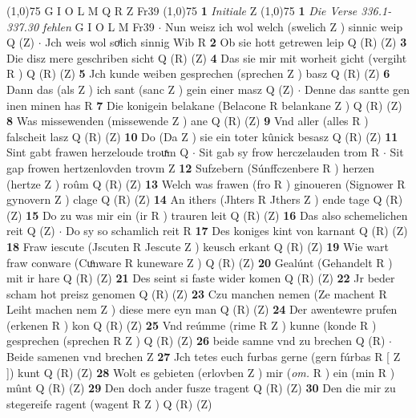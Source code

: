 \documentclass[8pt,a4paper,notitlepage]{article}
\begin{document}
\begin{table}[ht]
\begin{minipage}[t]{0.5\linewidth}
\scriptsize
\line(1,0){75} \newline
G I O L M Q R Z Fr39 \newline
\line(1,0){75} \newline
\textbf{1} \textit{Initiale} Z  \newline
\line(1,0){75} \newline
\textbf{1} \textit{Die Verse 336.1-337.30 fehlen} G I O L M Fr39   $\cdot$ Nun weisz ich wol welch (swelich Z ) sinnic weip Q (Z)  $\cdot$ Jch weis wol soͯlich sinnig Wib R \textbf{2} Ob sie hott getrewen leip Q (R) (Z) \textbf{3} Die disz mere geschriben sicht Q (R) (Z) \textbf{4} Das sie mir mit worheit gicht (vergiht R ) Q (R) (Z) \textbf{5} Jch kunde weiben gesprechen (sprechen Z ) basz Q (R) (Z) \textbf{6} Dann das (als Z ) ich sant (sanc Z ) gein einer masz Q (Z)  $\cdot$ Denne das santte gen inen minen has R \textbf{7} Die konigein belakane (Belacone R belankane Z ) Q (R) (Z) \textbf{8} Was missewenden (missewende Z ) ane Q (R) (Z) \textbf{9} Vnd aller (alles R ) falscheit lasz Q (R) (Z) \textbf{10} Do (Da Z ) sie ein toter kûnick besasz Q (R) (Z) \textbf{11} Sint gabt frawen herzeloude trouͯm Q  $\cdot$ Sit gab sy frow herczelauden trom R  $\cdot$ Sit gap frowen hertzenlovden trovm Z \textbf{12} Sufzebern (Súnffczenbere R ) herzen (hertze Z ) roûm Q (R) (Z) \textbf{13} Welch was frawen (fro R ) ginoueren (Signower R gynovern Z ) clage Q (R) (Z) \textbf{14} An ithers (Jhters R Jthers Z ) ende tage Q (R) (Z) \textbf{15} Do zu was mir ein (ir R ) trauren leit Q (R) (Z) \textbf{16} Das also schemelichen reit Q (Z)  $\cdot$ Do sy so schamlich reit R \textbf{17} Des koniges kint von karnant Q (R) (Z) \textbf{18} Fraw iescute (Jscuten R Jescute Z ) keusch erkant Q (R) (Z) \textbf{19} Wie wart fraw conware (Cuͦnware R kuneware Z ) Q (R) (Z) \textbf{20} Gealúnt (Gehandelt R ) mit ir hare Q (R) (Z) \textbf{21} Des seint si faste wider komen Q (R) (Z) \textbf{22} Jr beder scham hot preisz genomen Q (R) (Z) \textbf{23} Czu manchen nemen (Ze machent R Leiht machen nem Z ) diese mere eyn man Q (R) (Z) \textbf{24} Der awentewre prufen (erkenen R ) kon Q (R) (Z) \textbf{25} Vnd reúmme (rime R Z ) kunne (konde R ) gesprechen (sprechen R Z ) Q (R) (Z) \textbf{26} beide samne vnd zu brechen Q (R)  $\cdot$ Beide samenen vnd brechen Z \textbf{27} Jch tetes euch furbas gerne (gern fúrbas R [ Z ]) kunt Q (R) (Z) \textbf{28} Wolt es gebieten (erlovben Z ) mir (\textit{om.} R ) ein (min R ) mûnt Q (R) (Z) \textbf{29} Den doch ander fusze tragent Q (R) (Z) \textbf{30} Den die mir zu stegereife ragent (wagent R Z ) Q (R) (Z) \newline

\end{minipage}
\end{table}
\end{document}
